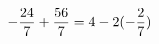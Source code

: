 \documentclass[preview]{standalone}
\begin{document}
\begin{align*}
\special{dvisvgm:raw <g id='unique000'>}- \frac{24}{7} + \frac{56}{7} = 4 - 2 (- \frac{2}{7})\special{dvisvgm:raw </g>}
\end{align*}
\end{document}
